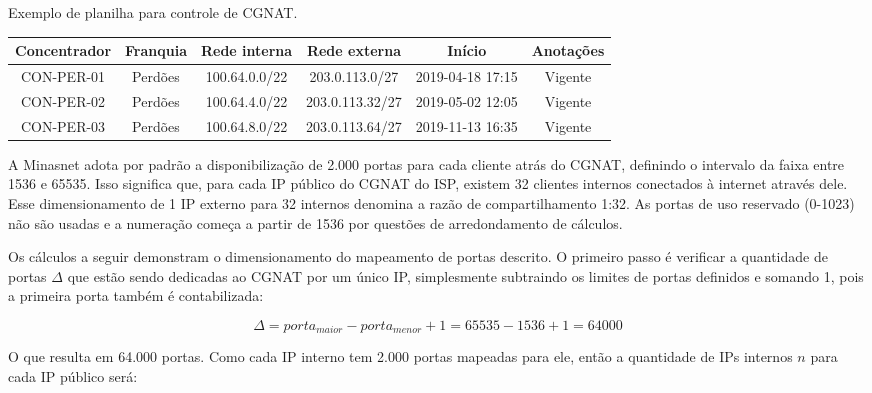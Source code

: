    \begin{quadro}[htb]
        \begin{center}
            \caption{Exemplo de planilha para controle de CGNAT.} 
            \label{tab:planilha_cgnat}
            \vspace{0.2cm}
        \footnotesize
            \begin{tabular}{|c|c|c|c|c|c|}
            \hline
            Concentrador & Franquia & Rede interna & Rede externa & Início & Anotações \\
            \hline
            \hline
            CON-PER-01 & Perdões & 100.64.0.0/22 & 203.0.113.0/27 & 2019-04-18 17:15 & Vigente \\
            CON-PER-02 & Perdões & 100.64.4.0/22 & 203.0.113.32/27 & 2019-05-02 12:05 & Vigente \\
            CON-PER-03 & Perdões & 100.64.8.0/22 & 203.0.113.64/27 & 2019-11-13 16:35 & Vigente \\
            \hline 
            \end{tabular}
        \end{center}
    \end{quadro}


    A Minasnet adota por padrão a disponibilização de 2.000 portas para cada cliente atrás do CGNAT, definindo o intervalo da faixa entre 1536 e 65535. Isso significa que, para cada IP público do CGNAT do ISP, existem 32 clientes internos conectados à internet através dele. Esse dimensionamento de 1 IP externo para 32 internos denomina a razão de compartilhamento 1:32. As portas de uso reservado (0-1023) não são usadas e a numeração começa a partir de 1536 por questões de arredondamento de cálculos.
    
    Os cálculos a seguir demonstram o dimensionamento do mapeamento de portas descrito. O primeiro passo é verificar a quantidade de portas $ \Delta $ que estão sendo dedicadas ao CGNAT por um único IP, simplesmente subtraindo os limites de portas definidos e somando 1, pois a primeira porta também é contabilizada:

    \begin{equation}
        \Delta = porta_{maior} - porta_{menor} + 1
               = 65535 - 1536 + 1
               = 64000
    \end{equation}
    
    O que resulta em 64.000 portas. Como cada IP interno tem 2.000 portas mapeadas para ele, então a quantidade de IPs internos $ n $ para cada IP público será:

